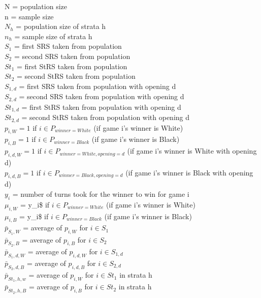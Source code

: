 \documentclass[11pt,]{article}
\begin{document}
N = population size\\
n = sample size\\
\(N_h\) = population size of strata h\\
\(n_h\) = sample size of strata h\\
\(S_1\) = first SRS taken from population\\
\(S_2\) = second SRS taken from population\\
\(St_1\) = first StRS taken from population\\
\(St_2\) = second StRS taken from population\\
\(S_{1,d}\) = first SRS taken from population with opening d\\
\(S_{2,d}\) = second SRS taken from population with opening d\\
\(St_{1,d}\) = first StRS taken from population with opening d\\
\(St_{2,d}\) = second StRS taken from population with opening d\\
\(p_{i,W} = 1\) if \(i \in P_{winner = White}\) (if game i's winner is
White)\\
\(p_{i,B} = 1\) if \(i \in P_{winner = Black}\) (if game i's winner is
Black)\\
\(p_{i,d,W} = 1\) if \(i \in P_{winner = White, opening = d}\) (if game
i's winner is White with opening d)\\
\(p_{i,d,B} = 1\) if \(i \in P_{winner = Black, opening = d}\) (if game
i's winner is Black with opening d)\\
\(y_i\) = number of turns took for the winner to win for game i\\
\(\mu_{i,W}\) = y\_i\$ if \(i \in P_{winner = White}\) (if game i's
winner is White)\\
\(\mu_{i,B}\) = y\_i\$ if \(i \in P_{winner = Black}\) (if game i's
winner is Black)\\
\(\bar p_{S_1,W}\) = average of \(p_{i,W}\) for \(i \in S_1\)\\
\(\bar p_{S_2,B}\) = average of \(p_{i,B}\) for \(i \in S_2\)\\
\(\bar p_{S_1,d,W}\) = average of \(p_{i,d,W}\) for \(i \in S_{1,d}\)\\
\(\bar p_{S_2,d,B}\) = average of \(p_{i,d,B}\) for \(i \in S_{2,d}\)\\
\(\bar p_{St_1,h,w}\) = average of \(p_{i,W}\) for \(i \in St_1\) in
strata h\\
\(\bar p_{St_2,h,B}\) = average of \(p_{i,B}\) for \(i \in St_2\) in
strata h\\
\end{document}
